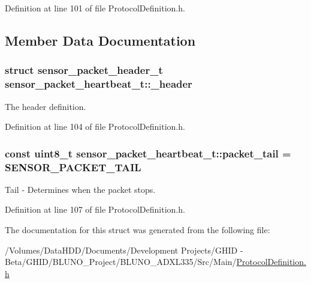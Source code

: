 \-Definition at line 101 of file \-Protocol\-Definition.\-h.



\subsection{\-Member \-Data \-Documentation}
\hypertarget{structsensor__packet__heartbeat__t_a385dff0d2b057f0b15a127253dd9cfd3}{
\subsubsection[{\-\_\-header}]{\setlength{\rightskip}{0pt plus 5cm}struct {\bf sensor\-\_\-packet\-\_\-header\-\_\-t} {\bf sensor\-\_\-packet\-\_\-heartbeat\-\_\-t\-::\-\_\-header}}}\label{structsensor__packet__heartbeat__t_a385dff0d2b057f0b15a127253dd9cfd3}


\-The header definition. 



\-Definition at line 104 of file \-Protocol\-Definition.\-h.

\hypertarget{structsensor__packet__heartbeat__t_afc573667875c2ca9d9a81dbcc0e53052}{
\subsubsection[{packet\-\_\-tail}]{\setlength{\rightskip}{0pt plus 5cm}const uint8\-\_\-t {\bf sensor\-\_\-packet\-\_\-heartbeat\-\_\-t\-::packet\-\_\-tail} = {\bf \-S\-E\-N\-S\-O\-R\-\_\-\-P\-A\-C\-K\-E\-T\-\_\-\-T\-A\-I\-L}}}\label{structsensor__packet__heartbeat__t_afc573667875c2ca9d9a81dbcc0e53052}


\-Tail -\/ \-Determines when the packet stops. 



\-Definition at line 107 of file \-Protocol\-Definition.\-h.



\-The documentation for this struct was generated from the following file\-:\begin{DoxyCompactItemize}
\item 
/\-Volumes/\-Data\-H\-D\-D/\-Documents/\-Development Projects/\-G\-H\-I\-D -\/ Beta/\-G\-H\-I\-D/\-B\-L\-U\-N\-O\-\_\-\-Project/\-B\-L\-U\-N\-O\-\_\-\-A\-D\-X\-L335/\-Src/\-Main/\hyperlink{_protocol_definition_8h}{\-Protocol\-Definition.\-h}\end{DoxyCompactItemize}

